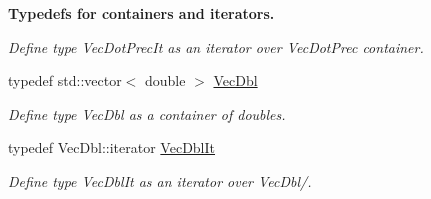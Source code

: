 \begin{Indent}{\bf \-Typedefs for containers and iterators.}
\begin{DoxyCompactItemize}
\begin{DoxyCompactList}\small\item\em \-Define type \-Vec\-Dot\-Prec\-It as an iterator over \-Vec\-Dot\-Prec container. \end{DoxyCompactList}\item 
typedef std\-::vector$<$ double $>$ \hyperlink{namespacesubpavings_a6b4d2e61b2f0b65cacc9c9322d89bc37}{\-Vec\-Dbl}
\begin{DoxyCompactList}\small\item\em \-Define type \-Vec\-Dbl as a container of doubles. \end{DoxyCompactList}\item 
typedef \-Vec\-Dbl\-::iterator \hyperlink{namespacesubpavings_a0b710d91e323ef0b7c2c811a535c5fab}{\-Vec\-Dbl\-It}
\begin{DoxyCompactList}\small\item\em \-Define type \-Vec\-Dbl\-It as an iterator over \-Vec\-Dbl/. \end{DoxyCompactList}\end{DoxyCompactItemize}
\end{Indent}
